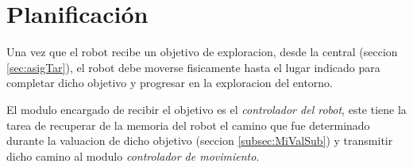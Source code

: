 






\section{Planificación}


Una vez que el robot recibe un objetivo de exploracion, desde la central
(seccion \ref{sec:asigTar}), el robot debe moverse fisicamente hasta el lugar
indicado para completar dicho objetivo y progresar en la exploracion del entorno.

El modulo encargado de recibir el objetivo es el \emph{controlador del robot},
este tiene la tarea de recuperar de la memoria del robot el camino que fue
determinado durante la valuacion de dicho objetivo (seccion
\ref{subsec:MiValSub}) y transmitir dicho camino al modulo \emph{controlador de
movimiento}. 

